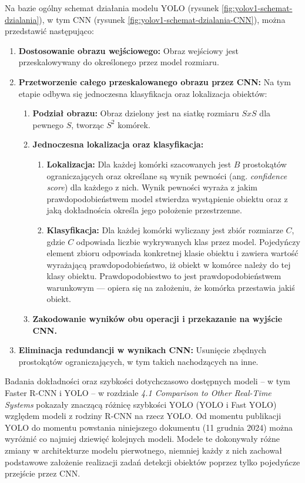 Na bazie \cite{yolo_pierwszy_artykul} ogólny schemat działania modelu YOLO (rysunek \ref{fig:yolov1-schemat-dzialania}), w tym CNN (rysunek \ref{fig:yolov1-schemat-dzialania-CNN}), można przedstawić następująco:
\begin{enumerate}
    \item \textbf{Dostosowanie obrazu wejściowego:} Obraz wejściowy jest przeskalowywany do określonego przez model rozmiaru.
    \item \textbf{Przetworzenie całego przeskalowanego obrazu przez CNN:} Na tym etapie odbywa się jednoczesna klasyfikacja oraz lokalizacja obiektów:
    \begin{enumerate}
        \item \textbf{Podział obrazu:} Obraz dzielony jest na siatkę rozmiaru $SxS$ dla pewnego $S$, tworząc $S^{2}$ komórek. 
        \item \textbf{Jednoczesna lokalizacja oraz klasyfikacja:} 
        \begin{enumerate}
            \item \textbf{Lokalizacja:} Dla każdej komórki szacowanych jest $B$ prostokątów ograniczających oraz określane są wynik pewności (ang. \emph{confidence score}) dla każdego z nich. Wynik pewności wyraża z jakim prawdopodobieństwem model stwierdza wystąpienie obiektu oraz z jaką dokładnościa określa jego położenie przestrzenne.
            \item \textbf{Klasyfikacja:} Dla każdej komórki wyliczany jest zbiór rozmiarze $C$, gdzie $C$ odpowiada liczbie wykrywanych klas przez model. Pojedyńczy element zbioru odpowiada konkretnej klasie obiektu i zawiera wartość wyrażającą prawdopodobieństwo, iż obiekt w komórce należy do tej klasy obiektu. Prawdopodobiestwo to jest prawdopodobieństwem warunkowym --- opiera się na założeniu, że komórka przestawia jakiś obiekt. 
        \end{enumerate}
        \item \textbf{Zakodowanie wyników obu operacji i przekazanie na wyjście CNN.}
    \end{enumerate}
    \item  \textbf{Eliminacja redundancji w wynikach CNN:} Usunięcie zbędnych prostokątów ograniczających, w tym takich nachodzących na inne. 
\end{enumerate}

Badania dokładności oraz szybkości dotychczasowo dostępnych modeli -- w tym Faster R-CNN i YOLO -- w rozdziale \emph{4.1 Comparison to Other Real-Time Systems} \cite{yolo_pierwszy_artykul} pokazały znaczącą różnicę szybkości YOLO (YOLO i Fast YOLO) względem modeli z rodziny R-CNN na rzecz YOLO. Od momentu publikacji YOLO do momentu powstania niniejszego dokumentu (11 grudnia 2024) można wyróżnić co najmiej dziewięć kolejnych modeli. Modele te dokonywały różne zmiany w architekturze modelu pierwotnego, niemniej każdy z nich zachował podstawowe założenie realizacji zadań detekcji obiektów poprzez tylko pojedyńcze przejście przez CNN. 

